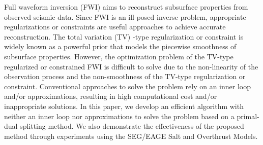 \begin{summary}
Full waveform inversion (FWI) aims to reconstruct subsurface properties from observed seismic data.
Since FWI is an ill-posed inverse problem, appropriate regularizations or constraints are useful approaches to achieve accurate reconstruction.
The total variation (TV) -type regularization or constraint is widely known as a powerful prior that models the piecewise smoothness of subsurface properties.
However, the optimization problem of the TV-type regularized or constrained FWI is difficult to solve due to the non-linearity of the observation process and the non-smoothness of the TV-type regularization or constraint.
Conventional approaches to solve the problem rely on an inner loop and/or approximations, resulting in high computational cost and/or inappropriate solutions.
In this paper, we develop an efficient algorithm with neither an inner loop nor approximations to solve the problem based on a primal-dual splitting method.
We also demonstrate the effectiveness of the proposed method through experiments using the SEG/EAGE Salt and Overthrust Models.
\end{summary}
